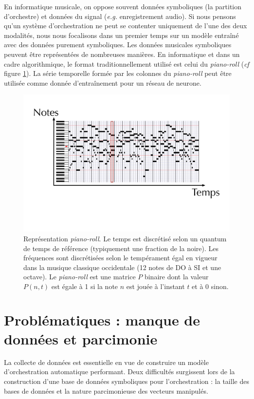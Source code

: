 \documentclass[a4paper, 10pt]{article} %
\begin{document}
En informatique musicale, on oppose souvent données symboliques (la partition d'orchestre) et données du signal (\textit{e.g.} enregistrement audio). Si nous pensons qu'un système d'orchestration ne peut se contenter uniquement de l'une des deux modalités, nous nous focalisons dans un premier temps sur un modèle entraîné avec des données purement symboliques. Les données musicales symboliques peuvent être représentées de nombreuses manières. En informatique et dans un cadre algorithmique, le format traditionnellement utilisé est celui du \textit{piano-roll} (\textit{cf} figure \ref{refpr}). La série temporelle formée par les colonnes du \textit{piano-roll} peut être utilisée comme donnée d'entraînement pour un réseau de neurone.
\begin{figure}
\begin{center}
\includegraphics[scale=0.25]{../pr.pdf}
\caption{Représentation \textit{piano-roll}. Le temps est discrétisé selon un quantum de temps de référence (typiquement une fraction de la noire). Les fréquences sont discrétisées selon le tempérament égal en vigueur dans la musique classique occidentale (12 notes de DO à SI et une octave). Le \textit{piano-roll} est une matrice $P$ binaire dont la valeur $P(n,t)$ est égale à 1 si la note $n$ est jouée à l'instant $t$ et à 0 sinon.}
\label{refpr}
\end{center}
\end{figure}

\section*{Problématiques : manque de données et parcimonie}
La collecte de données est essentielle en vue de construire un modèle d'orchestration automatique performant. Deux difficultés surgissent lors de la construction d'une base de données symboliques pour l'orchestration : la taille des bases de données et la nature parcimonieuse des vecteurs manipulés.
\end{document}
